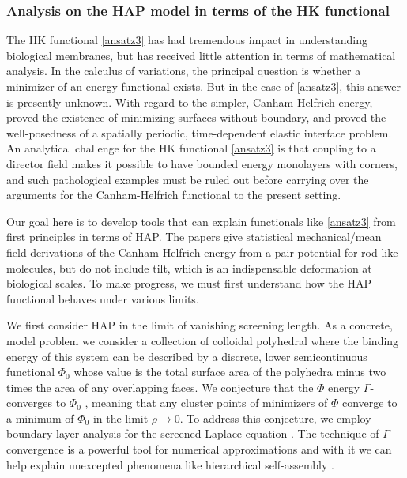 \subsubsection{Analysis on the HAP model in terms of the HK functional}
The HK functional \eqref{ansatz3} has had tremendous impact in understanding
biological membranes, but has received little attention in terms of mathematical
analysis. In the calculus of variations, the principal question is whether a
minimizer of an energy functional exists. But in the case of \eqref{ansatz3},
this answer is presently unknown. With regard to the simpler, Canham-Helfrich
energy, \cite{Simon1993} proved the existence of minimizing surfaces without boundary, 
and \cite{doi:10.1137/18M1195851} proved the well-posedness of a spatially periodic,
time-dependent elastic interface problem. An analytical challenge 
for the HK functional \eqref{ansatz3} is that coupling to a director field makes it
possible to have bounded energy monolayers with corners, and such
pathological examples must be ruled out before carrying over the arguments
for the Canham-Helfrich functional to the present setting.

Our goal here is to develop tools that can explain functionals like
\eqref{ansatz3} from first principles in terms of HAP. The papers
\cite{doi:10.1063/5.0009734,Seguin2012,Seguin2014} give statistical
mechanical/mean field derivations of the Canham-Helfrich energy from a
pair-potential for rod-like molecules, but do not include tilt, which is an
indispensable deformation at biological scales. To make progress, we must
first understand how the HAP functional behaves under various limits.

We first consider HAP in the limit of vanishing screening length.
As a concrete, model problem we consider a collection of colloidal polyhedral
where the binding energy of this system can be described by a
discrete, lower semicontinuous functional $\Phi_0$ whose value is the total
surface area of the polyhedra minus two times the area of any overlapping faces.
We conjecture that the $\Phi$ energy $\Gamma$-converges to $\Phi_0$
\cite{Mugnai2013}, meaning that any cluster points of minimizers of $\Phi$
converge to a minimum of $\Phi_0$ in the limit $\rho \to 0$. 
To address this conjecture, we employ boundary layer analysis for the screened
Laplace equation \cite{Lee2018, Lin2015, Shibata2004,1531-3492_2006_2_357, Lee2018}.
The technique of $\Gamma$-convergence is a powerful tool for numerical approximations
and with it we can help explain unexcepted phenomena like hierarchical self-assembly \cite{Luo2019}.

